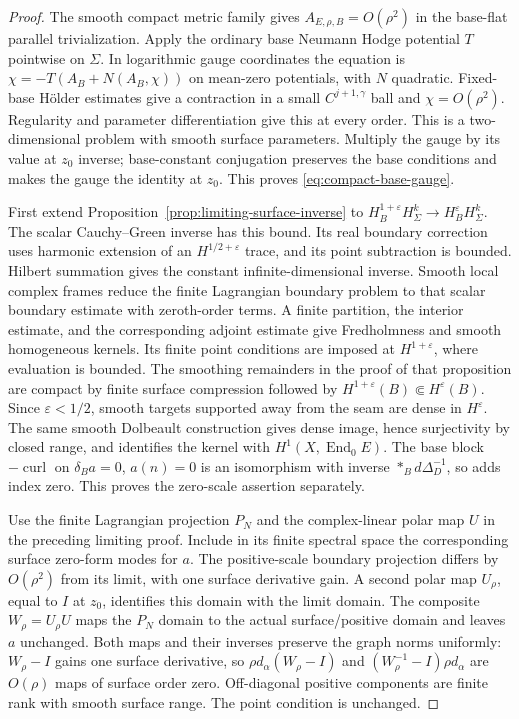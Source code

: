 \documentclass[11pt]{amsart}
\theoremstyle{definition}
\theoremstyle{remark}
\theoremstyle{plain}
\newcommand{\End}{\operatorname{End}}
\begin{document}
\begin{proof}
The smooth compact metric family gives $A_{E,\rho,B}=O(\rho^2)$
in the base-flat parallel trivialization. Apply the ordinary base
Neumann Hodge potential $T$ pointwise on $\Sigma$. In logarithmic
gauge coordinates the equation is
$\chi=-T(A_B+N(A_B,\chi))$ on mean-zero potentials, with $N$
quadratic. Fixed-base H\"older estimates give a contraction in a
small $C^{j+1,\gamma}$ ball and $\chi=O(\rho^2)$. Regularity and
parameter differentiation give this at every order. This is a
two-dimensional problem with smooth surface parameters. Multiply
the gauge by its value at $z_0$ inverse; base-constant conjugation
preserves the base conditions and makes the gauge the identity at
$z_0$. This proves \eqref{eq:compact-base-gauge}.

First extend Proposition~\ref{prop:limiting-surface-inverse} to
$H_B^{1+\varepsilon}H_\Sigma^k\to H_B^\varepsilon H_\Sigma^k$.
The scalar Cauchy--Green inverse has this bound. Its real boundary
correction uses harmonic extension of an $H^{1/2+\varepsilon}$
trace, and its point subtraction is bounded. Hilbert summation
gives the constant infinite-dimensional inverse. Smooth local
complex frames reduce the finite Lagrangian boundary problem to
that scalar boundary estimate with zeroth-order terms. A finite
partition, the interior estimate, and the corresponding adjoint
estimate give Fredholmness and smooth homogeneous kernels.
Its finite point conditions are imposed at $H^{1+\varepsilon}$,
where evaluation is bounded. The smoothing remainders in the
proof of that proposition are compact by finite surface compression
followed by $H^{1+\varepsilon}(B)\Subset H^\varepsilon(B)$.
Since $\varepsilon<1/2$, smooth targets supported away from the
seam are dense in $H^\varepsilon$. The same smooth Dolbeault
construction gives dense image, hence surjectivity by closed range,
and identifies the kernel with $H^1(X,\End_0E)$. The base block
$-\operatorname{curl}$ on $\delta_Ba=0$, $a(n)=0$ is an
isomorphism with inverse $*_Bd\Delta_D^{-1}$, so adds index zero.
This proves the zero-scale assertion separately.

Use the finite Lagrangian projection $P_N$ and the complex-linear
polar map $U$ in the preceding limiting proof. Include in its
finite spectral space the corresponding surface zero-form modes
for $a$. The positive-scale boundary projection differs by
$O(\rho^2)$ from its limit, with one surface derivative gain.
A second polar map $U_\rho$, equal to $I$ at $z_0$, identifies
this domain with the limit domain. The composite $W_\rho=U_\rho U$
maps the $P_N$ domain to the actual surface/positive domain and
leaves $a$ unchanged. Both maps and their inverses preserve the
graph norms uniformly: $W_\rho-I$ gains one surface derivative,
so $\rho d_\alpha(W_\rho-I)$ and
$(W_\rho^{-1}-I)\rho d_\alpha$ are $O(\rho)$ maps of surface
order zero. Off-diagonal positive components are finite rank with
smooth surface range. The point condition is unchanged.


\end{proof}
\end{document}
